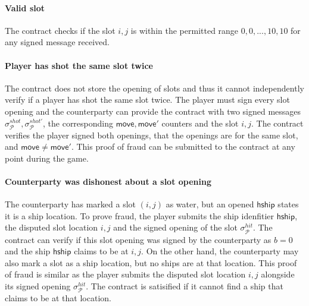 \documentclass{llncs}
\newcommand{\hship}{\mathsf{hship}}
\newcommand{\participant}{\mathcal{P}}
\begin{document}
\paragraph{Valid slot} 
The contract checks if the slot $i,j$ is within the permitted range $0,0,...,10,10$ for any signed message received. 

\paragraph{Player has shot the same slot twice} 
The contract does not store the opening of slots and thus it cannot independently verify if a player has shot the same slot twice.
The player must sign every slot opening and the counterparty can provide the contract with two signed messages $\sigma^{shot}_{\participant},\sigma^{shot'}_{\participant}$, the corresponding $\mathsf{move},\mathsf{move}'$ counters and the slot $i,j$. 
The contract verifies the player signed both openings, that the openings are for the same slot, and $\mathsf{move}\neq\mathsf{move}'$. 
This proof of fraud can be submitted to the contract at any point during the game. 

\paragraph{Counterparty was dishonest about a slot opening}
The counterparty has marked a slot $(i,j)$ as water, but an opened $\hship$ states it is a ship location. 
To prove fraud, the player submits the ship idenfitier $\hship$, the disputed slot location $i,j$ and the signed opening of the slot $\sigma^{hit}_{\participant}$. 
The contract can verify if this slot opening was signed by the counterparty as $b = 0$ and the ship $\hship$ claims to be at $i,j$.   
On the other hand, the counterparty may also mark a slot as a ship location,  but no ships are at that location.
This proof of fraud is similar as the player submits the disputed slot location $i,j$ alongside its signed opening $\sigma^{hit}_{\participant}$.
The contract is satisified if it cannot find a ship that claims to be at that location. 

\end{document}
